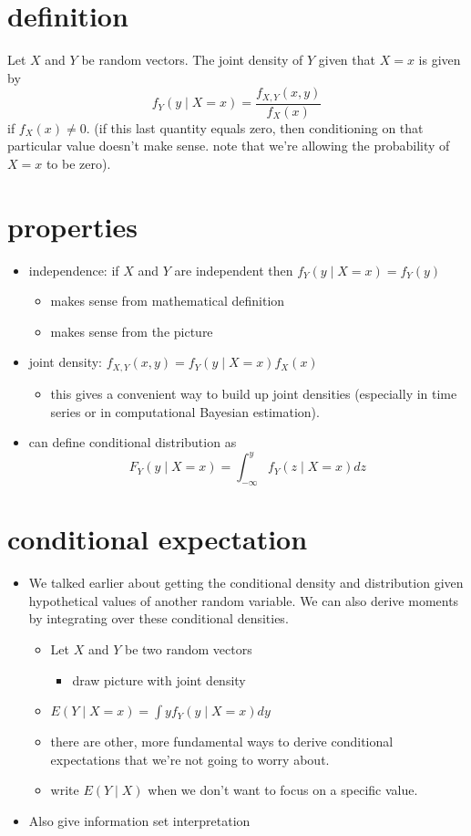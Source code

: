 \section{definition}
\label{sec-2}

    Let $X$ and $Y$ be random vectors.  The joint density of $Y$
    given that $X = x$ is given by
    \[ f_Y(y \mid X = x) = \frac{f_{X,Y}(x, y)}{f_X(x)} \]
    if $f_X(x) \neq 0$.  (if this last quantity equals zero, then
    conditioning on that particular value doesn't make sense.  note
    that we're allowing the probability of $X=x$ to be zero).
\section{properties}
\label{sec-3}

\begin{itemize}
\item independence: if $X$ and $Y$ are independent then 
      $f_Y(y \mid X = x) = f_Y(y)$
\begin{itemize}
\item makes sense from mathematical definition
\item makes sense from the picture
\end{itemize}
\item joint density: $f_{X,Y}(x,y) = f_Y(y \mid X = x) f_X(x)$
\begin{itemize}
\item this gives a convenient way to build up joint densities
        (especially in time series or in computational Bayesian
        estimation).
\end{itemize}
\item can define conditional distribution as
      \[ F_Y(y \mid X=x) = \int_{-\infty}^y f_Y(z \mid X = x) dz \]
\end{itemize}
\section{conditional expectation}
\label{sec-4}

\begin{itemize}
\item We talked earlier about getting the conditional density and
      distribution given hypothetical values of another random variable.
      We can also derive moments by integrating over these conditional
      densities.
\begin{itemize}
\item Let $X$ and $Y$ be two random vectors
\begin{itemize}
\item draw picture with joint density
\end{itemize}
\item $E(Y \mid X = x) = \int y f_Y(y \mid X = x) dy$
\item there are other, more fundamental ways to derive conditional
         expectations that we're not going to worry about.
\item write $E(Y \mid X)$ when we don't want to focus on a specific
         value.
\end{itemize}
\item Also give information set interpretation
\end{itemize}
